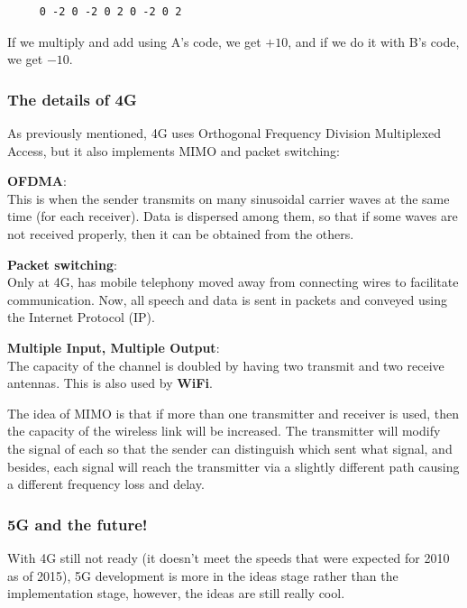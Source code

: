   \begin{verbatim}
     0 -2 0 -2 0 2 0 -2 0 2
  \end{verbatim}

  If we multiply and add using A's code, we get $+10$, and if we do it with
  B's code, we get $-10$.

\subsubsection{The details of 4G}

As previously mentioned, 4G uses Orthogonal Frequency Division Multiplexed
Access, but it also implements MIMO and packet switching:

\begin{description}
  \item \textbf{OFDMA}:\\
    This is when the sender transmits on many sinusoidal carrier waves at the
    same time (for each receiver). Data is dispersed among them, so that if some
    waves are not received properly, then it can be obtained from the others.

   \item \textbf{Packet switching}:\\
     Only at 4G, has mobile telephony moved away from connecting wires to
     facilitate communication. Now, all speech and data is sent in packets and
     conveyed using the Internet Protocol (IP).

  \item \textbf{Multiple Input, Multiple Output}:\\
    The capacity of the channel is doubled by having two transmit and two
    receive antennas. This is also used by \textbf{WiFi}.

    The idea of MIMO is that if more than one transmitter and receiver is used,
    then the capacity of the wireless link will be increased. The transmitter
    will modify the signal of each so that the sender can distinguish which sent
    what signal, and besides, each signal will reach the transmitter via a
    slightly different path causing a different frequency loss and delay.
\end{description}

\subsubsection{5G and the future!}

With 4G still not ready (it doesn't meet the speeds that were expected for 2010
as of 2015), 5G development is more in the ideas stage rather than the
implementation stage, however, the ideas are still really cool.


